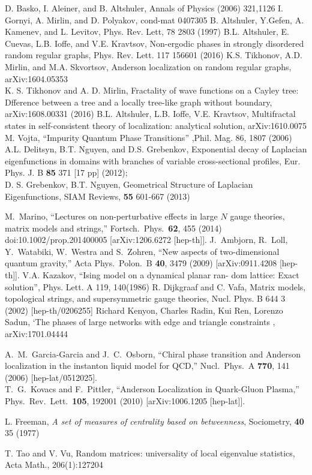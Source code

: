 \documentclass[aps,12pt]{revtex4}
\begin{document}
\begin{thebibliography}{99}
 D. Basko, I. Aleiner, and B. Altshuler, Annals of Physics (2006) 321,1126
I. Gornyi, A. Mirlin, and D. Polyakov, cond-mat 0407305
B. Altshuler, Y.Gefen, A. Kamenev, and L. Levitov, Phys. Rev. Lett, 78 2803 (1997)
 B.L. Altshuler, E. Cuevas, L.B. Ioffe, and V.E. Kravtsov, Non-ergodic phases in strongly disordered random regular graphs,
Phys. Rev. Lett. 117 156601 (2016)
K.S. Tikhonov, A.D. Mirlin, and M.A. Skvortsov, Anderson localization on random regular graphs, arXiv:1604.05353\\
K. S. Tikhonov and A. D. Mirlin, Fractality of wave functions on a Cayley tree: Dfference between a tree and a locally
tree-like graph without boundary, arXiv:1608.00331 (2016)
B.L. Altshuler, L.B. Ioffe, V.E. Kravtsov, Multifractal states in self-consistent theory of localization: analytical solution,
arXiv:1610.0075
    M. Vojta,
    "`Impurity Quantum Phase Transitions"'
,Phil. Mag. 86, 1807 (2006)
A.L. Delitsyn, B.T. Nguyen, and D.S. Grebenkov, Exponential decay of Laplacian
eigenfunctions in domains with branches of variable cross-sectional profiles, Eur. Phys. J. B {\bf
85} 371 [17 pp] (2012); \\ D. S. Grebenkov, B.T. Nguyen, Geometrical Structure of Laplacian
Eigenfunctions, SIAM Reviews, {\bf 55} 601-667 (2013)


 M.~Marino,
  ``Lectures on non-perturbative effects in large $N$ gauge theories, matrix models and strings,''
  Fortsch.\ Phys.\  {\bf 62}, 455 (2014)
  doi:10.1002/prop.201400005
  [arXiv:1206.6272 [hep-th]].
  J.~Ambjorn, R.~Loll, Y.~Watabiki, W.~Westra and S.~Zohren,
  ``New aspects of two-dimensional quantum gravity,''
  Acta Phys.\ Polon.\ B {\bf 40}, 3479 (2009)
  [arXiv:0911.4208 [hep-th]].
    V.A. Kazakov,  "`Ising model on a dynamical planar ran-
dom  lattice:   Exact  solution"',  Phys.  Lett.  A
119,  140(1986)
     R. Dijkgraaf and C. Vafa, Matrix models, topological strings, and supersymmetric
gauge theories, Nucl. Phys. B 644 3 (2002) [hep-th/0206255]
Richard Kenyon, Charles Radin, Kui Ren, Lorenzo Sadun,
`The phases of large networks with edge and triangle constraints ,
arXiv:1701.04444

     A.~M.~Garcia-Garcia and J.~C.~Osborn,
  ``Chiral phase transition and Anderson localization in the instanton liquid model for QCD,''
  Nucl.\ Phys.\ A {\bf 770}, 141 (2006)
  [hep-lat/0512025].\\
    T.~G.~Kovacs and F.~Pittler,
  ``Anderson Localization in Quark-Gluon Plasma,''
  Phys.\ Rev.\ Lett.\  {\bf 105}, 192001 (2010)
  [arXiv:1006.1205 [hep-lat]].

 L. Freeman, \emph{A set of measures of centrality based on betweenness}, Sociometry, {\bf 40} 35 (1977)

  T. Tao and V. Vu, Random matrices: universality of local
eigenvalue statistics, Acta Math., 206(1):127204

\end{thebibliography}
\end{document}
